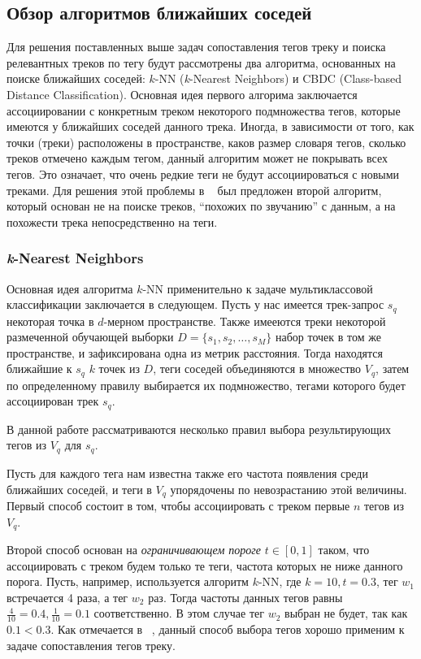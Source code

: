 \subsection{Обзор алгоритмов ближайших соседей}

Для решения поставленных выше задач сопоставления тегов треку и поиска релевантных треков по тегу будут рассмотрены два алгоритма, основанных на поиске ближайших соседей: 
$k$-NN (\emph{k}-Nearest Neighbors) и CBDC (Class-based Distance Classification). Основная идея первого алгорима заключается ассоциировании с конкретным треком некоторого подмножества тегов, 
которые имеются у ближайших соседей данного трека. Иногда, в зависимости от того, как точки (треки) расположены в пространстве, каков размер словаря тегов, сколько треков отмечено
каждым тегом, данный алгоритим может не покрывать всех тегов. Это означает, что очень редкие теги не будут ассоциироваться с новыми треками. Для решения этой проблемы 
в ~\cite{msordo_thesis} был предложен второй алгоритм, который основан не на поиске треков, ``похожих по звучанию'' с данным, а на похожести трека непосредственно на теги.

\subsubsection{\emph{k}-Nearest Neighbors}

Основная идея алгоритма $k$-NN применительно к задаче мультиклассовой классификации заключается в следующем. Пусть у нас имеется трек-запрос $s_q$ \ld некоторая точка в $d$-мерном пространстве.
Также имееются треки некоторой размеченной обучающей выборки $ D = \{s_1, s_2, \ldots, s_M \}$ \ld набор точек в том же пространстве, и зафиксирована одна из метрик расстояния. 
Тогда находятся ближайшие к $s_q$ $k$ точек из $D$, теги соседей объединяются в множество $V_q$, затем по определенному правилу выбирается их подмножество, тегами которого будет ассоциирован трек $s_q$.

В данной работе рассматриваются несколько правил выбора результирующих тегов из $V_q$ для $s_q$. 

Пусть для каждого тега нам известна также его частота появления среди ближайших соседей, и теги
в $V_q$ упорядочены по невозрастанию этой величины. Первый способ состоит в том, чтобы ассоциировать с треком первые $n$ тегов из $V_q$.

Второй способ основан на \emph{ограничивающем пороге} $t \in [0, 1]$ таком, что ассоциировать с треком будем только те теги, частота которых не ниже данного порога.
Пусть, например, используется алгоритм $k$-NN, где $k = 10, t = 0.3$, тег $w_1$ встречается 4 раза, а тег $w_2$  раз. 
Тогда частоты данных тегов равны $\frac{4}{10} = 0.4, \frac{1}{10} = 0.1$ соответственно. В этом случае тег $w_2$ выбран не будет, так как $0.1 < 0.3$.
Как отмечается в ~\cite{msordo_thesis}, данный способ выбора тегов хорошо применим к задаче сопоставления тегов треку.

